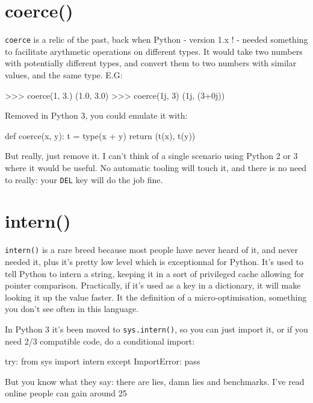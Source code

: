 \section{coerce()}

\lstinline{coerce} is a relic of the past, back when Python - version 1.x ! - needed something to facilitate arythmetic operations on different types. It would take two numbers with potentially different types, and convert them to two numbers with similar values, and the same type. E.G:

\begin{py2}
>>> coerce(1, 3.)
(1.0, 3.0)
>>> coerce(1j, 3)
(1j, (3+0j))
\end{py2}

Removed in Python 3, you could emulate it with:

\begin{py2and3}
def coerce(x, y):
    t = type(x + y)
    return (t(x), t(y))
\end{py2and3}

But really, just remove it. I can't think of a single scenario using Python 2 or 3 where it would be useful. No automatic tooling will touch it, and there is no need to really: your \lstinline{DEL} key will do the job fine.


\section{intern()}

\lstinline{intern()} is a rare breed because most people have never heard of it, and never needed it, plus it's pretty low level which is exceptionnal for Python. It's used to tell Python to intern a string, keeping it in a sort of privileged cache allowing for pointer comparison. Practically, if it's used as a key in a dictionary, it will make looking it up the value faster. It the definition of a micro-optimisation, something you don't see often in this language.

In Python 3 it's been moved to \lstinline{sys.intern()}, so you can just import it, or if you need 2/3 compatible code, do a conditional import:

\begin{py2and3}
try:
    from sys import intern
except ImportError:
    pass
\end{py2and3}

But you know what they say: there are lies, damn lies and benchmarks. I've read online people can gain around 25%

